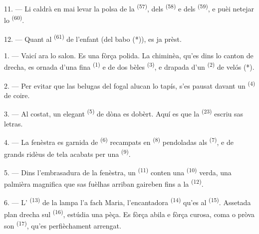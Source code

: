 

11. --- Li caldrà en mai levar la polsa de la 
\textsuperscript{(57)}, dels  \textsuperscript{(58)} e dels
 \textsuperscript{(59)}, e puèi netejar lo 
\textsuperscript{(60)}.

12. --- Quant al  \textsuperscript{(61)} de l'enfant (del babo (*)),
es ja prèst.

\VUsaut{5.0mm}
\VUsaut{3.0mm}

1. --- Vaicí ara lo salon. Es una  fòrça polida. La chiminèa,
qu'es dins lo canton de drecha, es ornada d'una fina 
\textsuperscript{(1)} e de dos bèles  \textsuperscript{(3)}, e
drapada d'un  \textsuperscript{(2)} de velós (*).

2. --- Per evitar que las belugas del fogal alucan lo tapís, s'es pausat davant
un  \textsuperscript{(4)} de coire.

3. --- Al costat, un elegant  \textsuperscript{(5)} de dòna es
dobèrt. Aquí es que la  \textsuperscript{(23)} escriu sas
letras.

4. --- La fenèstra es garnida de  \textsuperscript{(6)}
recampats en  \textsuperscript{(8)} pendoladas als
 \textsuperscript{(7)}, e de grands ridèus de tela acabats per una
 \textsuperscript{(9)}.

5. --- Dins l'embrasadura de la fenèstra, un 
\textsuperscript{(11)} conten una  \textsuperscript{(10)} verda, una
palmièra magnifica que sas fuèlhas arriban gaireben fins a la  \textsuperscript{(12)}.

6. --- L' \textsuperscript{(13)} de la lampa l'a fach Maria, l'encantadora  \textsuperscript{(14)} qu'es al 
\textsuperscript{(15)}. Assetada plan drecha sul 
\textsuperscript{(16)}, estúdia una pèça. Es fòrça abila e fòrça curosa, coma o
pròva son  \textsuperscript{(17)}, qu'es perfièchament
arrengat.

